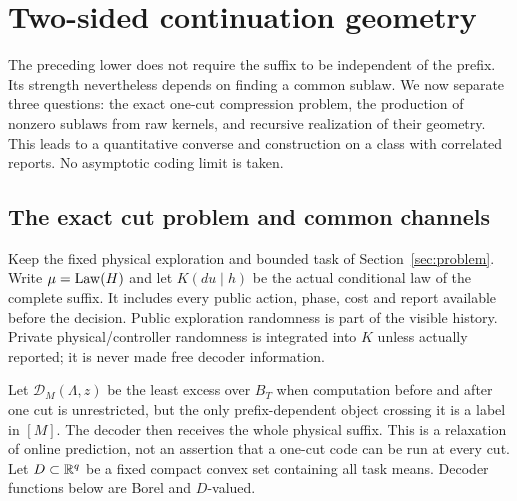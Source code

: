 \section{Two-sided continuation geometry}\label{sec:dual}
The preceding lower does not require the suffix to be independent of the prefix. Its strength nevertheless depends on finding a common sublaw. We now separate three questions: the exact one-cut compression problem, the production of nonzero sublaws from raw kernels, and recursive realization of their geometry. This leads to a quantitative converse and construction on a class with correlated reports. No asymptotic coding limit is taken.

\subsection{The exact cut problem and common channels}
Keep the fixed physical exploration and bounded task of Section~\ref{sec:problem}. Write $\mu=\operatorname{Law}(H)$ and let $K(du\mid h)$ be the actual conditional law of the complete suffix. It includes every public action, phase, cost and report available before the decision. Public exploration randomness is part of the visible history. Private physical/controller randomness is integrated into $K$ unless actually reported; it is never made free decoder information.

Let $\mathcal D_M(\Lambda,z)$ be the least excess over $B_T$ when computation before and after one cut is unrestricted, but the only prefix-dependent object crossing it is a label in $[M]$. The decoder then receives the whole physical suffix. This is a relaxation of online prediction, not an assertion that a one-cut code can be run at every cut. Let $D\subset\mathbb R^q$ be a fixed compact convex set containing all task means. Decoder functions below are Borel and $D$-valued.

